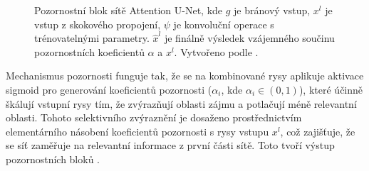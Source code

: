 \begin{figure}[H]
\caption[Pozornostní blok sítě Attention U-Net]{Pozornostní blok sítě Attention U-Net, kde $g$ je bránový vstup, $x^l$ je vstup z skokového propojení, $\psi$ je konvoluční operace s trénovatelnými parametry. $\hat{x}^l$ je finálně výsledek vzájemného součinu pozornostních koeficientů $\alpha$ a $x^l$. Vytvořeno podle \cite{attentionunet}. }
\label{fig:attention_unet}
\end{figure}

Mechanismus pozornosti funguje tak, že se na kombinované rysy aplikuje aktivace sigmoid pro generování koeficientů pozornosti (\(\alpha_i\), kde \(\alpha_i \in (0, 1)\)), které účinně škálují vstupní rysy tím, že zvýrazňují oblasti zájmu a potlačují méně relevantní oblasti. Tohoto selektivního zvýraznění je dosaženo prostřednictvím elementárního násobení koeficientů pozornosti s rysy vstupu $x^l$, což zajišťuje, že se síť zaměřuje na relevantní informace z první části sítě. Toto tvoří výstup pozornostních bloků \cite{attentionunet}.

\endinput